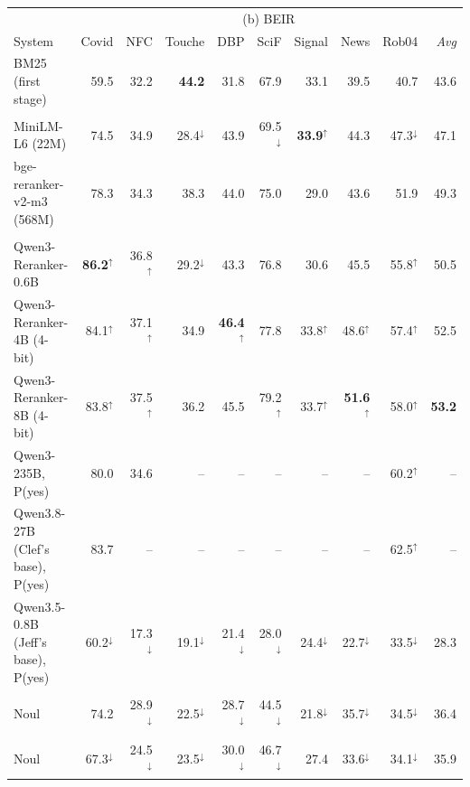 \begin{table}[p]
\begin{tabular}{lrrrrrrrr|r}
\toprule
 & \multicolumn{9}{c}{(b) BEIR} \\
System & Covid & NFC & Touche & DBP & SciF & Signal & News & Rob04 & \textit{Avg} \\
\midrule
BM25 (first stage) & 59.5 & 32.2 & \textbf{44.2} & 31.8 & 67.9 & 33.1 & 39.5 & 40.7 & 43.6 \\
\addlinespace[1pt]
\multicolumn{10}{l}{\textit{Cross-encoders}} \\
MiniLM-L6 (22M) & 74.5 & 34.9 & 28.4$^\downarrow$ & 43.9 & 69.5$^\downarrow$ & \textbf{33.9}$^\uparrow$ & 44.3 & 47.3$^\downarrow$ & 47.1 \\
bge-reranker-v2-m3 (568M) & 78.3 & 34.3 & 38.3 & 44.0 & 75.0 & 29.0 & 43.6 & 51.9 & 49.3 \\
\addlinespace[1pt]
\multicolumn{10}{l}{\textit{Label-probability LLM rerankers}} \\
Qwen3-Reranker-0.6B & \textbf{86.2}$^\uparrow$ & 36.8$^\uparrow$ & 29.2$^\downarrow$ & 43.3 & 76.8 & 30.6 & 45.5 & 55.8$^\uparrow$ & 50.5 \\
Qwen3-Reranker-4B (4-bit) & 84.1$^\uparrow$ & 37.1$^\uparrow$ & 34.9 & \textbf{46.4}$^\uparrow$ & 77.8 & 33.8$^\uparrow$ & 48.6$^\uparrow$ & 57.4$^\uparrow$ & 52.5 \\
Qwen3-Reranker-8B (4-bit) & 83.8$^\uparrow$ & 37.5$^\uparrow$ & 36.2 & 45.5 & 79.2$^\uparrow$ & 33.7$^\uparrow$ & \textbf{51.6}$^\uparrow$ & 58.0$^\uparrow$ & \textbf{53.2} \\
Qwen3-235B, P(yes) & 80.0 & 34.6 & -- & -- & -- & -- & -- & 60.2$^\uparrow$ & -- \\
Qwen3.8-27B (Clef's base), P(yes) & 83.7 & -- & -- & -- & -- & -- & -- & 62.5$^\uparrow$ & -- \\
Qwen3.5-0.8B (Jeff's base), P(yes) & 60.2$^\downarrow$ & 17.3$^\downarrow$ & 19.1$^\downarrow$ & 21.4$^\downarrow$ & 28.0$^\downarrow$ & 24.4$^\downarrow$ & 22.7$^\downarrow$ & 33.5$^\downarrow$ & 28.3 \\
\addlinespace[1pt]
\multicolumn{10}{l}{\textit{Laya (421M)}} \\
\quad Noul & 74.2 & 28.9$^\downarrow$ & 22.5$^\downarrow$ & 28.7$^\downarrow$ & 44.5$^\downarrow$ & 21.8$^\downarrow$ & 35.7$^\downarrow$ & 34.5$^\downarrow$ & 36.4 \\
\addlinespace[1pt]
\multicolumn{10}{l}{\textit{Jeff (0.8B)}} \\
\quad Noul & 67.3$^\downarrow$ & 24.5$^\downarrow$ & 23.5$^\downarrow$ & 30.0$^\downarrow$ & 46.7$^\downarrow$ & 27.4 & 33.6$^\downarrow$ & 34.1$^\downarrow$ & 35.9 \\

\end{tabular}
\end{table}
